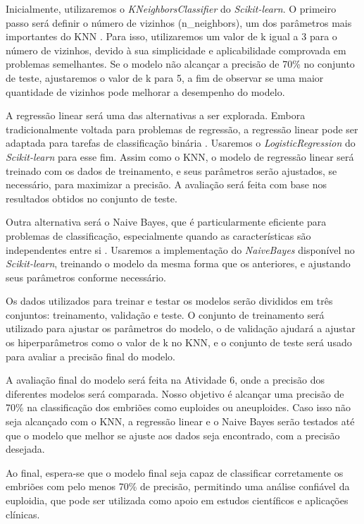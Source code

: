 Inicialmente, utilizaremos o \textit{KNeighborsClassifier} do \textit{Scikit-learn}. O primeiro passo será definir o número de vizinhos (n\_neighbors), um dos parâmetros mais importantes do KNN \cite{zhang2016}. Para isso,  utilizaremos um valor de k igual a 3 para o número de vizinhos, devido à sua simplicidade e aplicabilidade comprovada em problemas semelhantes. Se o modelo não alcançar a precisão de 70\% no conjunto de teste, ajustaremos o valor de k para 5, a fim de observar se uma maior quantidade de vizinhos pode melhorar a desempenho do modelo.

A regressão linear será uma das alternativas a ser explorada. Embora tradicionalmente voltada para problemas de regressão, a regressão linear pode ser adaptada para tarefas de classificação binária  \cite{rodrigues}. Usaremos o \textit{LogisticRegression} do \textit{Scikit-learn} para esse fim. Assim como o KNN, o modelo de regressão linear será treinado com os dados de treinamento, e seus parâmetros serão ajustados, se necessário, para maximizar a precisão. A avaliação será feita com base nos resultados obtidos no conjunto de teste.

Outra alternativa será o Naive Bayes, que é particularmente eficiente para problemas de classificação, especialmente quando as características são independentes entre si  \cite{rish2001}. Usaremos a implementação do \textit{NaiveBayes} disponível no \textit{Scikit-learn}, treinando o modelo da mesma forma que os anteriores, e ajustando seus parâmetros conforme necessário.

Os dados utilizados para treinar e testar os modelos serão divididos em três conjuntos: treinamento, validação e teste. O conjunto de treinamento será utilizado para ajustar os parâmetros do modelo, o de validação ajudará a ajustar os hiperparâmetros como o valor de k no KNN, e o conjunto de teste será usado para avaliar a precisão final do modelo.

A avaliação final do modelo será feita na Atividade 6, onde a precisão dos diferentes modelos será comparada. Nosso objetivo é alcançar uma precisão de 70\% na classificação dos embriões como euploides ou aneuploides. Caso isso não seja alcançado com o KNN, a regressão linear e o Naive Bayes serão testados até que o modelo que melhor se ajuste aos dados seja encontrado, com a precisão desejada.

Ao final, espera-se que o modelo final seja capaz de classificar corretamente os embriões com pelo menos 70\% de precisão, permitindo uma análise confiável da euploidia, que pode ser utilizada como apoio em estudos científicos e aplicações clínicas.

